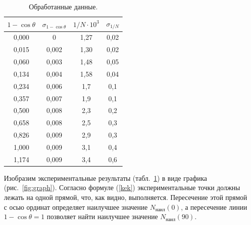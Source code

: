 \documentclass[a4paper,12pt]{article} %
\begin{document}
		\begin{table}[H]
			\caption{Обработанные данные.}
			\label{table:data}
			\begin{tabular}{|c|c|c|c|}
				\hline
				$1 - \cos \theta$ & $\sigma_{1-\cos \theta}$ & $1/N \cdot 10^3$ & $\sigma_{1/N}$ \\ \hline
				0,000             & 0                        & 1,27  & 0,02           \\ \hline
				0,015             & 0,002                    & 1,30  & 0,02           \\ \hline
				0,060             & 0,003                    & 1,48  & 0,05           \\ \hline
				0,134             & 0,004                    & 1,58  & 0,04           \\ \hline
				0,234             & 0,006                    & 1,7   & 0,1            \\ \hline
				0,357             & 0,007                    & 1,9   & 0,1            \\ \hline
				0,500             & 0,008                    & 2,3   & 0,2            \\ \hline
				0,658             & 0,008                    & 2,5   & 0,3            \\ \hline
				0,826             & 0,009                    & 2,9   & 0,3            \\ \hline
				1,000             & 0,009                    & 3,1   & 0,4            \\ \hline
				1,174             & 0,009                    & 3,4   & 0,6            \\ \hline
			\end{tabular}
		\end{table}
		
		Изобразим экспериментальные результаты (табл.~\ref{table:data}) в виде графика (рис.~\ref{fig:graph}). Согласно формуле (\ref{kek}) экспериментальные точки должны лежать на одной прямой, что, как видно, выполняется. Пересечение этой прямой с осью ординат определяет наилучшее значение $N_\text{наил}(0)$, а пересечение линии $1 - \cos \theta = 1$ позволяет найти наилучшее значение $N_\text{наил}(90)$. 
	
\end{document}

